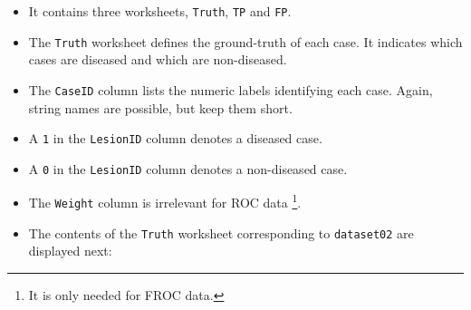 \documentclass[]{book}
\providecommand{\tightlist}{%
  \setlength{\itemsep}{0pt}\setlength{\parskip}{0pt}}
\let\rmarkdownfootnote\footnote%
\def\footnote{\protect\rmarkdownfootnote}
\begin{document}
\begin{itemize}
\tightlist
\item
  It contains three worksheets, \texttt{Truth}, \texttt{TP} and \texttt{FP}.
\item
  The \texttt{Truth} worksheet defines the ground-truth of each case. It indicates which cases are diseased and which are non-diseased.
\item
  The \texttt{CaseID} column lists the numeric labels identifying each case. Again, string names are possible, but keep them short.
\item
  A \texttt{1} in the \texttt{LesionID} column denotes a diseased case.
\item
  A \texttt{0} in the \texttt{LesionID} column denotes a non-diseased case.
\item
  The \texttt{Weight} column is irrelevant for ROC data \footnote{It is only needed for FROC data.}.
\item
  The contents of the \texttt{Truth} worksheet corresponding to \texttt{dataset02} are displayed next:
\end{itemize}
\end{document}
